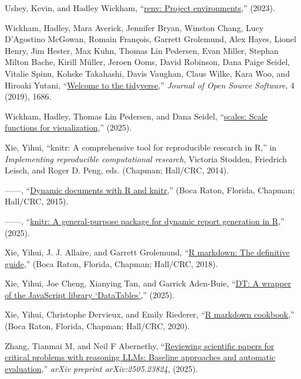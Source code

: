 \documentclass[
  11pt,
  letterpaper,
  DIV=11,
  numbers=noendperiod]{scrreprt}
\newlength{\cslhangindent}
\newenvironment{CSLReferences}[2] %
 {\begin{list}{}{%
  \setlength{\itemindent}{0pt}
  \setlength{\leftmargin}{0pt}
  \setlength{\parsep}{0pt}
  \ifodd #1
   \setlength{\leftmargin}{\cslhangindent}
   \setlength{\itemindent}{-1\cslhangindent}
  \fi
  \setlength{\itemsep}{#2\baselineskip}}}
 {\end{list}}
\begin{document}
\begin{CSLReferences}{1}{0}
Ushey, Kevin, and Hadley Wickham,
{``\href{https://doi.org/10.32614/CRAN.package.renv}{{renv}: Project
environments},''} (2023).

Wickham, Hadley, Mara Averick, Jennifer Bryan, Winston Chang, Lucy
D'Agostino McGowan, Romain François, Garrett Grolemund, Alex Hayes,
Lionel Henry, Jim Hester, Max Kuhn, Thomas Lin Pedersen, Evan Miller,
Stephan Milton Bache, Kirill Müller, Jeroen Ooms, David Robinson, Dana
Paige Seidel, Vitalie Spinu, Kohske Takahashi, Davis Vaughan, Claus
Wilke, Kara Woo, and Hiroaki Yutani,
{``\href{https://doi.org/10.21105/joss.01686}{Welcome to the
{tidyverse}},''} \emph{Journal of Open Source Software}, 4 (2019), 1686.

Wickham, Hadley, Thomas Lin Pedersen, and Dana Seidel,
{``\href{https://scales.r-lib.org}{{scales}: Scale functions for
visualization},''} (2025).

Xie, Yihui, {``{knitr}: A comprehensive tool for reproducible research
in {R},''} in \emph{Implementing reproducible computational research},
Victoria Stodden, Friedrich Leisch, and Roger D. Peng, eds. (Chapman;
Hall/CRC, 2014).

------, {``\href{https://yihui.org/knitr/}{Dynamic documents with {R}
and knitr},''} (Boca Raton, Florida, Chapman; Hall/CRC, 2015).

------, {``\href{https://yihui.org/knitr/}{{knitr}: A general-purpose
package for dynamic report generation in {R}},''} (2025).

Xie, Yihui, J. J. Allaire, and Garrett Grolemund,
{``\href{https://bookdown.org/yihui/rmarkdown}{R markdown: The
definitive guide},''} (Boca Raton, Florida, Chapman; Hall/CRC, 2018).

Xie, Yihui, Joe Cheng, Xianying Tan, and Garrick Aden-Buie,
{``\href{https://github.com/rstudio/DT}{{DT}: A wrapper of the
JavaScript library {`{DataTables}'}},''} (2025).

Xie, Yihui, Christophe Dervieux, and Emily Riederer,
{``\href{https://bookdown.org/yihui/rmarkdown-cookbook}{R markdown
cookbook},''} (Boca Raton, Florida, Chapman; Hall/CRC, 2020).

Zhang, Tianmai M, and Neil F Abernethy,
{``\href{https://arxiv.org/abs/2505.23824v2}{Reviewing scientific papers
for critical problems with reasoning LLMs: Baseline approaches and
automatic evaluation},''} \emph{arXiv preprint arXiv:2505.23824},
(2025).


\end{CSLReferences}
\end{document}
